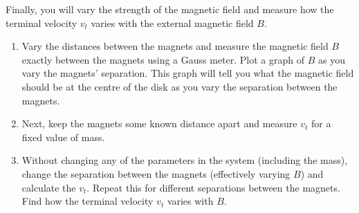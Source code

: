 Finally, you will vary the strength of the magnetic field and measure how the terminal velocity $v_t$ varies with the external magnetic field $B$.
\begin{enumerate}
    \item Vary the distances between the magnets and measure the magnetic field $B$ exactly between the magnets using a Gauss meter. Plot a graph of $B$ as you vary the magnets' separation. This graph will tell you what the magnetic field should be at the centre of the disk as you vary the separation between the magnets.
    
    \item Next, keep the magnets some known distance apart and measure $v_t$ for a fixed value of mass. 
    
    \item Without changing any of the parameters in the system (including the mass), change the separation between the magnets (effectively varying $B$) and calculate the $v_t$. Repeat this for different separations between the magnets. Find how the terminal velocity $v_t$ varies with $B$.
    
\end{enumerate}
